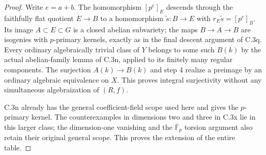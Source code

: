 \begin{proof}
Write $e=a+b$. The homomorphism $[p^e]_E$ descends
through the faithfully flat quotient $E\to B$ to a
homomorphism $\widetilde s:B\to E$ with
$r_E\widetilde s=[p^e]_B$. Its image $A\subset E\subset G$
is a closed abelian subvariety; the maps $B\to A\to B$
are isogenies with $p$-primary kernels, exactly as in
the final descent argument of C.3q.
Every ordinary algebraically trivial class of $Y$
belongs to some such $B(k)$ by the actual abelian-family
lemma of C.3n, applied to its finitely many regular
components. The surjection $A(k)\to B(k)$ and step 4
realize a preimage by an ordinary algebraic equivalence
on $X$. This proves integral surjectivity without any
simultaneous algebraization of $(R,f)$.

C.3n already has the general coefficient-field
scope used here and gives the $p$-primary kernel.
The counterexamples in dimensions two and three in
C.3x lie in this larger class; the dimension-one
vanishing and the $\overline{\mathbb F}_p$ torsion
argument also retain their original general scope.
This proves the extension of the entire table.
\end{proof}
